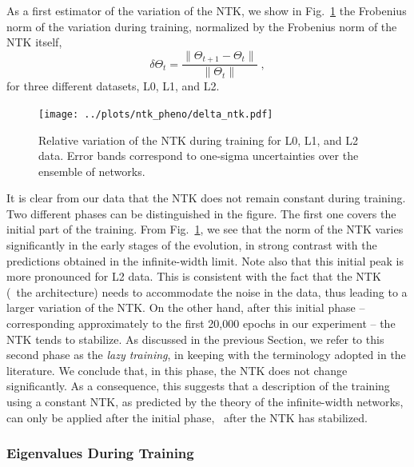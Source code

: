 As a first estimator of the variation of the NTK, we show in Fig.~\ref{fig:NTKTime} the 
Frobenius norm of the variation during training, normalized by the Frobenius norm of the NTK itself, 
\begin{equation}
\delta \Theta_t = \frac{\lVert \Theta_{t+1} - \Theta_t \rVert}{\lVert \Theta_t \rVert} \;,
\label{eq:DeltaNTK}
\end{equation}
for three different datasets, L0, L1, and L2. 

\begin{figure}[ht!]
  \centering
  \texttt{[image: ../plots/ntk\_pheno/delta\_ntk.pdf]}
  \caption{Relative variation of the NTK during training for L0, L1, and L2
  data. Error bands correspond to one-sigma uncertainties over the ensemble of
  networks.}
  \label{fig:NTKTime}
\end{figure}

It is clear from our data that the NTK does not remain constant during training. 
Two different phases can be distinguished in the figure. The first one
covers the initial part of the training. From Fig.~\ref{fig:NTKTime}, we see
that the norm of the NTK varies significantly in the early stages of the evolution, in strong contrast with 
the predictions obtained in the infinite-width limit. Note also that this
initial peak is more pronounced for L2 data. This is consistent with the fact
that the NTK (\ie\ the architecture) needs to accommodate the noise in
the data, thus leading to a larger variation of the NTK. On the other hand,
after this initial phase -- corresponding approximately to the first 20,000 epochs in our experiment --
the NTK tends to stabilize. As discussed in the previous Section, we refer to this
second phase as the \textit{lazy training}, in keeping with the terminology
adopted in the literature. We conclude that, in this phase, the NTK does not
change significantly. As a consequence, this suggests that a description of 
the training using a constant NTK, as predicted by the theory of the
infinite-width networks, can only be applied after the initial
phase, \ie\ after the NTK has stabilized. 

\FloatBarrier

\subsubsection{Eigenvalues During Training}
\label{sec:EigenvalDuringTrain}

